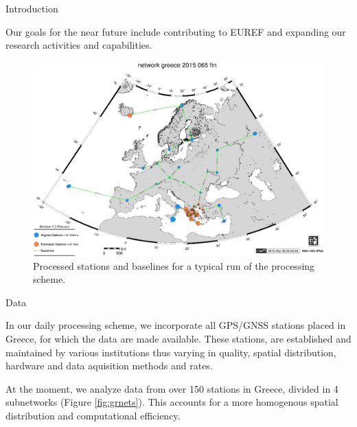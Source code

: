 \documentclass[final,a0,portrait]{beamer}
\newlength{\onecolwid}
\begin{document}
\begin{frame}[t]
\begin{columns}[t]
\begin{column}{\onecolwid}
\begin{block}{Introduction}
{Our goals for the near future include contributing to EUREF and expanding our research activities and capabilities.

}
\end{block}


\begin{figure}
    \includegraphics[width=0.8\onecolwid]{eu-greece-15065-fin-proc.eps}
    \caption{Processed stations and baselines for a typical run of the processing scheme.}
    \label{fig:proc-net}
\end{figure}
\begin{block}{Data}
{\small
In our daily processing scheme, we incorporate all GPS/GNSS stations placed in Greece, for which the data are made available. 
These stations, are established and maintained by various institutions thus varying in quality, spatial distribution, hardware and 
data aquisition methods and rates.

At the moment, we analyze data from over 150 stations in Greece, divided in 4 subnetworks (Figure \ref{fig:grnets}). 
This accounts for a more homogenous spatial distribution and computational efficiency.


}
\end{block}
\end{column}
\end{columns}
\end{frame}
\end{document}
